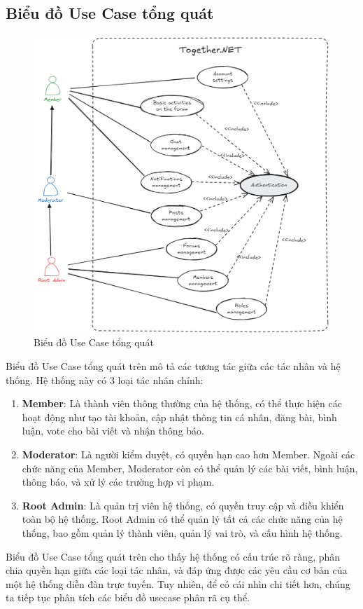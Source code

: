 \documentclass[../index.tex]{subfiles}
\begin{document}
    \subsection{Biểu đồ Use Case tổng quát}
    \begin{figure}[H]
        \centering
        \includegraphics[width=0.85\linewidth]{../figures/usecase-summary.png}
        \caption{Biểu đồ Use Case tổng quát}
    \end{figure}
    Biểu đồ Use Case tổng quát trên mô tả các tương tác giữa các tác nhân và hệ
    thống. Hệ thống này có 3 loại tác nhân chính:
    \begin{enumerate}
        \item \textbf{Member}: Là thành viên thông thường của hệ thống, có thể
            thực hiện các hoạt động như tạo tài khoản, cập nhật thông tin cá nhân,
            đăng bài, bình luận, vote cho bài viết và nhận thông báo.

        \item \textbf{Moderator}: Là người kiểm duyệt, có quyền hạn cao hơn
            Member. Ngoài các chức năng của Member, Moderator còn có thể quản lý
            các bài viết, bình luận, thông báo, và xử lý các trường hợp vi phạm.

        \item \textbf{Root Admin}: Là quản trị viên hệ thống, có quyền truy cập
            và điều khiển toàn bộ hệ thống. Root Admin có thể quản lý tất cả các
            chức năng của hệ thống, bao gồm quản lý thành viên, quản lý vai trò,
            và cấu hình hệ thống.
    \end{enumerate}
    Biểu đồ Use Case tổng quát trên cho thấy hệ thống có cấu trúc rõ ràng, phân chia
    quyền hạn giữa các loại tác nhân, và đáp ứng được các yêu cầu cơ bản của một
    hệ thống diễn đàn trực tuyến. Tuy nhiên, để có cái nhìn chi tiết hơn, chúng ta
    tiếp tục phân tích các biểu đồ usecase phân rã cụ thể.
\end{document}
